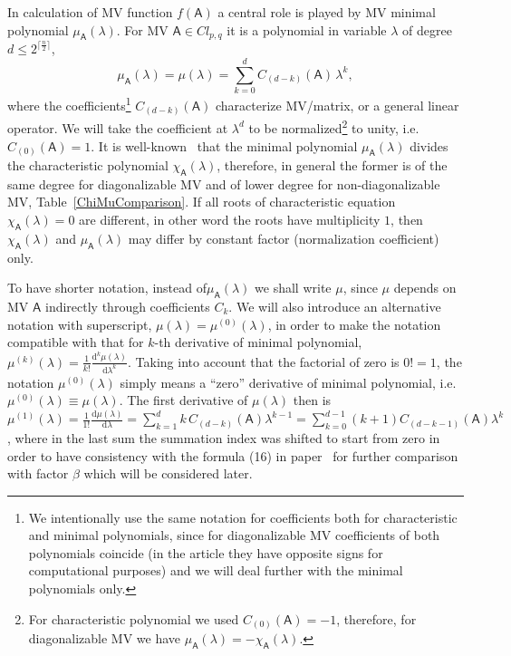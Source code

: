 \documentclass[AMA,STIX1COL]{WileyNJD-v2}
\def\m#1{\mathsf{#1}} %
\newcommand{\cl}[2]{\ensuremath{\mathit{Cl}_{#1,#2}}}
\newcommand{\dd}{\mathrm{d}} %
\def\m#1{\mathsf{#1}}%
\begin{document}
In calculation of MV function $f(\m{A})$ a central role is
played by MV minimal polynomial $\mu_{\m{A}}(\lambda)$. For MV $\m{A}\in\cl{p}{q}$ it is a
polynomial in variable $\lambda$ of degree $d\le
2^{\lceil\tfrac{n}{2}\rceil}$,
\begin{equation}\label{MinPolyDef}
  \mu_{\m{A}}(\lambda)=\mu(\lambda)=\sum_{k=0}^{d} C_{(d-k)}(\m{A})\, \lambda^k,
\end{equation}
where the coefficients\footnote{We intentionally use the same notation for coefficients both for characteristic and
minimal polynomials, since  for diagonalizable MV coefficients of both polynomials coincide
(in the article they have opposite signs for computational purposes)
and we will deal  further with the minimal polynomials only.} $C_{(d-k)}(\m{A})$ characterize  MV/matrix,
or a general linear operator. We will take the coefficient at
$\lambda ^d$ to be normalized\footnote{For characteristic polynomial we used $C_{(0)}(\m{A})=-1$,
therefore, for diagonalizable MV we have $\mu_{\m{A}}(\lambda)=-\chi_{\m{A}}(\lambda)$.} to unity,
 i.e. $C_{(0)}(\m{A})=1$. It
is well-known~\cite{Garibaldi2004} that the  minimal polynomial $\mu_{\m{A}}(\lambda)$
divides the characteristic polynomial $\chi_{\m{A}}(\lambda)$,
therefore, in general the former is of the same degree for diagonalizable MV and of
lower degree for non-diagonalizable MV,
Table~\ref{ChiMuComparison}. If all roots of characteristic
equation $\chi_{\m{A}}(\lambda)=0$ are different, in other word
the roots have  multiplicity $1$, then $\chi_{\m{A}}(\lambda)$ and
$\mu_{\m{A}}(\lambda)$ may differ by constant factor (normalization coefficient) only.


To have shorter notation, instead of$\mu_{\m{A}}(\lambda)$ we
shall write $\mu$, since $\mu$ depends on MV $\m{A}$ indirectly
through coefficients $C_k$. We will also introduce an alternative
notation with superscript, $\mu(\lambda)=\mu^{(0)}(\lambda)$, in
order to make the notation compatible with that for $k$-th
derivative of minimal polynomial,
$\mu^{(k)}(\lambda)=\frac{1}{k!}\frac{\dd^k \mu(\lambda)}{\dd
\lambda^k}$.  Taking into account that the factorial of zero is
$0!=1$, the notation $\mu^{(0)}(\lambda)$ simply means a ``zero''
derivative of minimal polynomial, i.e.
$\mu^{(0)}(\lambda)\equiv\mu(\lambda)$. The first derivative of
$\mu(\lambda)$ then is $\mu^{(1)}(\lambda)=\frac{1}{1!}\frac{\dd
\mu(\lambda)}{\dd \lambda}=\sum_{k=1}^{d} k\,
C_{(d-k)}(\m{A})\lambda ^{k-1}=\sum_{k=0}^{d-1} (k+1)
C_{(d-k-1)}(\m{A})\lambda ^{k}$,
where in the last sum the
summation index was shifted to start from zero in order to have consistency with
the formula (16) in paper~\cite{AcusMMAS2023}  for further
comparison with  factor $\beta$ which will be considered later.
\end{document}
